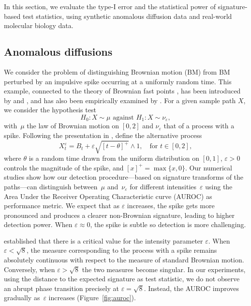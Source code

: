

In this section, we evaluate the type-I error and the statistical power of signature-based test statistics, using synthetic anomalous diffusion data and real-world molecular biology data.

\subsection{Anomalous diffusions}\label{sec:anomalousDiffs}

We consider the problem of distinguishing Brownian motion (BM) from BM perturbed by an impulsive spike occurring at a uniformly random time. This example, connected to the theory of Brownian fast points \citep{davis1985brownian}, has been introduced by \citet{davis1984randomly} and \citet{hitchcock1992some}, and has also been empirically examined by \citet{cass2024variance}. For a given sample path $X$, we consider the hypothesis test
\begin{equation*}
H_0: X\sim\mu  \text{ against } 
        H_1: X\sim\nu_\varepsilon,
\end{equation*}
 with~$\mu$ the law of Brownian motion on $[0,2]$ and $\nu_\varepsilon$ that of a process with a spike. Following the presentation in \cite[Chapter 6]{hitchcock1992some},
 define the alternative process
$$
X^\varepsilon_t=B_t+\varepsilon\sqrt{[t-\theta]^+}\wedge 1, \quad\text{for } t\in [0,2],
$$
where $\theta$ is a random time drawn from the uniform distribution on $[0,1]$, $\varepsilon>0$ controls the magnitude of the spike, and $[x]^+=\max\{x,0\}$. Our numerical studies show how our detection procedure—based on signature transforms of the paths—can distinguish between~$\mu$ and~$\nu_\varepsilon$ for different intensities~$\varepsilon$ using the Area Under the Receiver Operating Characteristic curve (AUROC) as performance metric. We expect that as $\varepsilon$ increases, the spike gets more pronounced and produces a clearer non-Brownian signature, leading to higher detection power. When $\varepsilon \approx 0$, the spike is subtle so detection is more challenging.

\citet{hitchcock1992some} established that there is a critical value for the intensity parameter $\varepsilon$. When $\varepsilon < \sqrt{8}$, the measure corresponding to the process with a spike remains absolutely continuous with respect to the measure of standard Brownian motion. Conversely, when $\varepsilon > \sqrt{8}$ the two measures become singular. In our experiments, using the distance to the expected signature as test statistic, we do not observe an abrupt phase transition precisely at $\varepsilon=\sqrt{8}$. Instead, the AUROC improves gradually as~$\varepsilon$ increases 
(Figure~\ref{fig:auroc}). 

